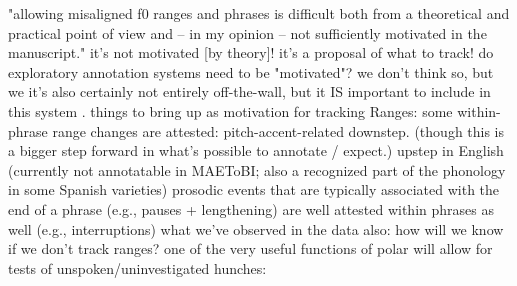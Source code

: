 \markdownRendererUlEndTight \markdownRendererUlItemEnd 
\markdownRendererUlEndTight \markdownRendererUlItemEnd 
\markdownRendererUlItem "allowing misaligned f0 ranges and phrases is difficult both from a theoretical and practical point of view and – in my opinion – not sufficiently motivated in the manuscript."\markdownRendererInterblockSeparator
{}\markdownRendererUlBeginTight
\markdownRendererUlItem it's not motivated [by theory]! it's a proposal of what to track!\markdownRendererUlItemEnd 
\markdownRendererUlItem do exploratory annotation systems need to be "motivated"?\markdownRendererInterblockSeparator
{}\markdownRendererUlBeginTight
\markdownRendererUlItem we don't think so, but we \markdownRendererUlItemEnd 
\markdownRendererUlItem it's also certainly not entirely off-the-wall, but it IS important to include in this system .\markdownRendererUlItemEnd 
\markdownRendererUlItem things to bring up as motivation for tracking Ranges:\markdownRendererInterblockSeparator
{}\markdownRendererUlBeginTight
\markdownRendererUlItem some within-phrase range changes are attested:\markdownRendererInterblockSeparator
{}\markdownRendererUlBeginTight
\markdownRendererUlItem pitch-accent-related downstep. (though this is a bigger step forward in what's possible to annotate / expect.)\markdownRendererUlItemEnd 
\markdownRendererUlItem upstep in English (currently not annotatable in MAE\markdownRendererUnderscore{}ToBI; also a recognized part of the phonology in some Spanish varieties)\markdownRendererUlItemEnd 
\markdownRendererUlEndTight \markdownRendererUlItemEnd 
\markdownRendererUlItem prosodic events that are typically associated with the end of a phrase (e.g., pauses + lengthening) are well attested within phrases as well (e.g., interruptions)\markdownRendererUlItemEnd 
\markdownRendererUlItem what we've observed in the data\markdownRendererInterblockSeparator
{}\markdownRendererUlBeginTight
\markdownRendererUlItem {}\markdownRendererUlItemEnd 
\markdownRendererUlEndTight \markdownRendererUlItemEnd 
\markdownRendererUlEndTight \markdownRendererUlItemEnd 
\markdownRendererUlItem also: how will we know if we don't track ranges?\markdownRendererInterblockSeparator
{}\markdownRendererUlBeginTight
\markdownRendererUlItem one of the very useful functions of polar will allow for tests of unspoken/uninvestigated hunches:\markdownRendererUlItemEnd 
